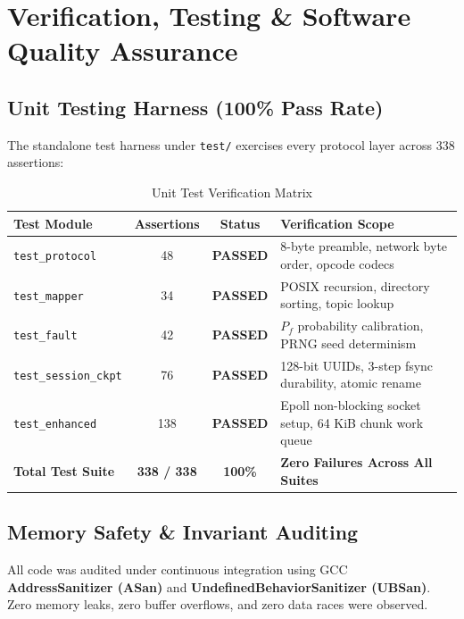 \documentclass[11pt,a4paper]{article}
\begin{document}
\section{Verification, Testing \& Software Quality Assurance}

\subsection{Unit Testing Harness (100\% Pass Rate)}
The standalone test harness under \texttt{test/} exercises every protocol layer across 338 assertions:

\begin{table}[H]
    \centering
    \small
    \begin{tabularx}{\textwidth}{l c c X}
        \toprule
        \textbf{Test Module} & \textbf{Assertions} & \textbf{Status} & \textbf{Verification Scope} \\
        \midrule
        \texttt{test\_protocol} & 48 & \textbf{PASSED} & 8-byte preamble, network byte order, opcode codecs \\
        \texttt{test\_mapper} & 34 & \textbf{PASSED} & POSIX recursion, directory sorting, topic lookup \\
        \texttt{test\_fault} & 42 & \textbf{PASSED} & $P_f$ probability calibration, PRNG seed determinism \\
        \texttt{test\_session\_ckpt} & 76 & \textbf{PASSED} & 128-bit UUIDs, 3-step fsync durability, atomic rename \\
        \texttt{test\_enhanced} & 138 & \textbf{PASSED} & Epoll non-blocking socket setup, 64 KiB chunk work queue \\
        \midrule
        \textbf{Total Test Suite} & \textbf{338 / 338} & \textbf{100\%} & \textbf{Zero Failures Across All Suites} \\
        \bottomrule
    \end{tabularx}
    \caption{Unit Test Verification Matrix}
    \label{tab:test_matrix}
\end{table}

\subsection{Memory Safety \& Invariant Auditing}
All code was audited under continuous integration using GCC \textbf{AddressSanitizer (ASan)} and \textbf{UndefinedBehaviorSanitizer (UBSan)}. Zero memory leaks, zero buffer overflows, and zero data races were observed.
\end{document}
